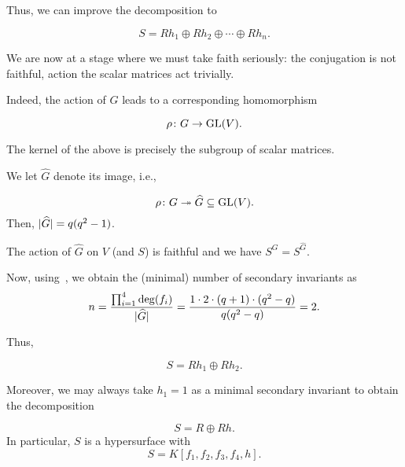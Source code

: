 \documentclass[12pt]{article}
\begin{document}
	Thus, we can improve the decomposition to
	\begin{tcolorbox}
		\begin{equation*} 
			S = R h_{1} \oplus R h_{2} \oplus \cdots \oplus R h_{n}.
		\end{equation*}
	\end{tcolorbox}

	We are now at a stage where we must take faith seriously:
	the conjugation is not faithful, action the scalar matrices act trivially. 

	Indeed, the action of $G$ leads to a corresponding homomorphism
	\begin{tcolorbox}
		\begin{equation*} 
			\rho \colon G \to \operatorname{GL}(V).
		\end{equation*}
	\end{tcolorbox}
	The kernel of the above is precisely the subgroup of scalar matrices.

	We let $\widehat{G}$ denote its image, i.e.,
	\begin{tcolorbox}
		\begin{equation*} 
			\rho \colon G \twoheadrightarrow \widehat{G} \subseteq \operatorname{GL}(V).
		\end{equation*}
		Then, ${\lvert \widehat{G} \lvert} = q(q^{2} - 1)$.
	\end{tcolorbox}

	The action of $\widehat{G}$ on $V$ (and $S$) is faithful and we have $S^{G} = S^{\widehat{G}}$.

	Now, using~\Cite[Theorem 3.7.1]{DerksenKemper}, we obtain the (minimal) number of secondary invariants as
	\begin{equation*} 
		n = \frac{\prod_{i = 1}^{4} \deg(f_{i})}{{\lvert \widehat{G} \lvert}} = \frac{1 \cdot 2 \cdot (q + 1) \cdot (q^{2} - q)}{q (q^{2} - q)} = 2.
	\end{equation*}

	Thus,
	\begin{tcolorbox}
		\begin{equation*} 
			S = R h_{1} \oplus R h_{2}.
		\end{equation*}
	\end{tcolorbox}

	Moreover, we may always take $h_{1} = 1$ as a minimal secondary invariant to obtain the decomposition
	\begin{tcolorbox}
		\begin{equation*} 
			S = R \oplus R h.
		\end{equation*}
		In particular, $S$ is a hypersurface with
		\begin{equation*} 
			S = K[f_{1}, f_{2}, f_{3}, f_{4}, h].
		\end{equation*}
	\end{tcolorbox}
\end{document}
